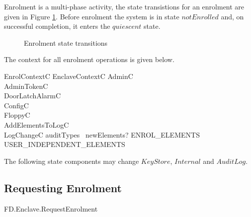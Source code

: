 Enrolment is a multi-phase activity, the state transistions for an
enrolment are given in Figure \ref{fig:enrol}. Before enrolment the
system is in state $notEnrolled$ and, on successful completion, it
enters the $quiescent$ state.

\begin{figure}[htbp]
  \begin{center}
    \leavevmode
    \caption{Enrolment state transitions}
    \label{fig:enrol}
  \end{center}
\end{figure}

The context for all enrolment operations is given below.

\begin{schema}{EnrolContextC}
        EnclaveContextC
\also
        \Xi AdminC
\\      \Xi AdminTokenC
\\      \Xi DoorLatchAlarmC
\\      \Xi ConfigC
\\      \Xi FloppyC
\\      AddElementsToLogC
\\      LogChangeC
\where
        auditTypes~ newElements? \subseteq ENROL\_ELEMENTS \cup USER\_INDEPENDENT\_ELEMENTS
\end{schema}

\begin{Zcomment}
\item
The following state components may change 
$KeyStore$, $Internal$ and  $AuditLog$. 
\end{Zcomment}


\subsection{Requesting Enrolment}


\begin{traceunit}{FD.Enclave.RequestEnrolment}
\end{traceunit}


